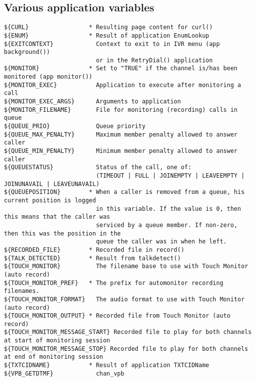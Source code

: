\subsection{Various application variables}
\begin{verbatim}
${CURL}                 * Resulting page content for curl()
${ENUM}                 * Result of application EnumLookup
${EXITCONTEXT}            Context to exit to in IVR menu (app background())
                          or in the RetryDial() application
${MONITOR}              * Set to "TRUE" if the channel is/has been monitored (app monitor())
${MONITOR_EXEC}           Application to execute after monitoring a call
${MONITOR_EXEC_ARGS}      Arguments to application
${MONITOR_FILENAME}       File for monitoring (recording) calls in queue
${QUEUE_PRIO}             Queue priority
${QUEUE_MAX_PENALTY}      Maximum member penalty allowed to answer caller
${QUEUE_MIN_PENALTY}      Minimum member penalty allowed to answer caller
${QUEUESTATUS}            Status of the call, one of:
                          (TIMEOUT | FULL | JOINEMPTY | LEAVEEMPTY | JOINUNAVAIL | LEAVEUNAVAIL)
${QUEUEPOSITION}        * When a caller is removed from a queue, his current position is logged
                          in this variable. If the value is 0, then this means that the caller was
						  serviced by a queue member. If non-zero, then this was the position in the
						  queue the caller was in when he left.
${RECORDED_FILE}        * Recorded file in record()
${TALK_DETECTED}        * Result from talkdetect()
${TOUCH_MONITOR}          The filename base to use with Touch Monitor (auto record)
${TOUCH_MONITOR_PREF}   * The prefix for automonitor recording filenames.
${TOUCH_MONITOR_FORMAT}   The audio format to use with Touch Monitor (auto record)
${TOUCH_MONITOR_OUTPUT} * Recorded file from Touch Monitor (auto record)
${TOUCH_MONITOR_MESSAGE_START} Recorded file to play for both channels at start of monitoring session
${TOUCH_MONITOR_MESSAGE_STOP} Recorded file to play for both channels at end of monitoring session
${TXTCIDNAME}           * Result of application TXTCIDName
${VPB_GETDTMF}            chan_vpb
\end{verbatim}

